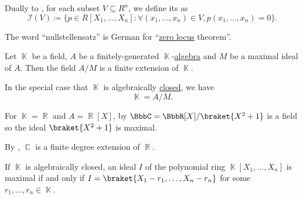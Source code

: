 \begin{definition}\label{def:ideal_of_affine_variety}\mcite\cite[70]{КоцевСидеров2016}
  Dually to , for each subset \( V \subseteq R^n \), we define its  as
  \begin{equation*}
    \mathcal{I}(V) \coloneqq \{ p \in R[X_1, \ldots, X_n] \colon \forall (x_1, \ldots, x_n) \in V, p(x_1, \ldots, x_n) = 0 \}.
  \end{equation*}
\end{definition}

\begin{remark}\label{rem:nullstelletsatz_etymology}
  The word \enquote{nullstellensatz} is German for \enquote{\hyperref[def:zero_locus]{zero locus} theorem}.
\end{remark}

\begin{theorem}\label{thm:algebraic_nullstellensatz}\mcite\cite[64]{КоцевСидеров2016}
  Let \( \BbbK \) be a field, \( A \) be a finitely-generated \( \BbbK \)-\hyperref[def:algebra_over_ring]{algebra} and \( M \) be a maximal ideal of \( A \). Then the field \( A / M \) is a finite extension of \( \BbbK \).

  In the special case that \( \BbbK \) is algebraically \hyperref[def:algebraically_closed_field]{closed}, we have
  \begin{equation*}
    \BbbK = A / M.
  \end{equation*}
\end{theorem}

\begin{example}\label{ex:algebraic_nullstellensatz_real_over_complex}
  For \( \BbbK = \BbbR \) and \( A = \BbbR[X] \), by  \( \BbbC = \BbbR[X] / \braket{X^2 + 1} \) is a field so the ideal \( \braket{X^2 + 1} \) is maximal.

  By , \( \BbbC \) is a finite degree extension of \( \BbbR \).
\end{example}

\begin{corollary}\label{thm:closed_field_maximal_ideal_representation}\mcite\cite[exer. 8.1]{КоцевСидеров2016}
  If \( \BbbK \) is algebraically closed, an ideal \( I \) of the polynomial ring \( \BbbK[X_1, \ldots, X_n] \) is maximal if and only if \( I = \braket{X_1 - r_1, \ldots, X_n - r_n} \) for some \( r_1, \ldots, r_n \in \BbbK \).
\end{corollary}

